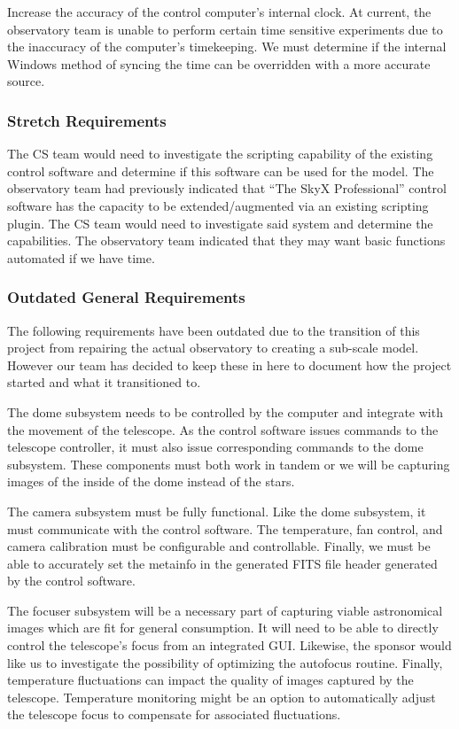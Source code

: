 \documentclass[12pt]{article}
\begin{document}
Increase the accuracy of the control computer’s internal clock. At current, the observatory team is unable to perform certain time sensitive experiments due to the inaccuracy of the computer’s timekeeping. We must determine if the internal Windows method of syncing the time can be overridden with a more accurate source.

\subsubsection{Stretch Requirements}

The CS team would need to investigate the scripting capability of the existing control software and determine if this software can be used for the model. The observatory team had previously indicated that “The SkyX Professional” control software has the capacity to be extended/augmented via an existing scripting plugin. The CS team would need to investigate said system and determine the capabilities. The observatory team indicated that they may want basic functions automated if we have time.

\subsubsection{Outdated General Requirements}

The following requirements have been outdated due to the transition of this project from repairing the actual observatory to creating a sub-scale model. However our team has decided to keep these in here to document how the project started and what it transitioned to.

The dome subsystem needs to be controlled by the computer and integrate with the movement of the telescope. As the control software issues commands to the telescope controller, it must also issue corresponding commands to the dome subsystem. These components must both work in tandem or we will be capturing images of the inside of the dome instead of the stars.

The camera subsystem must be fully functional. Like the dome subsystem, it must communicate with the control software. The temperature, fan control, and camera calibration must be configurable and controllable. Finally, we must be able to accurately set the metainfo in the generated FITS file header generated by the control software.

The focuser subsystem will be a necessary part of capturing viable astronomical images which are fit for general consumption. It will need to be able to directly control the telescope’s focus from an integrated GUI. Likewise, the sponsor would like us to investigate the possibility of optimizing the autofocus routine. Finally, temperature fluctuations can impact the quality of images captured by the telescope. Temperature monitoring might be an option to automatically adjust the telescope focus to compensate for associated fluctuations.
\end{document}
